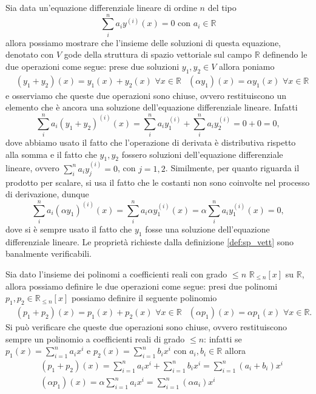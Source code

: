 \begin{example}
    Sia data un'equazione differenziale lineare di ordine $n$ del tipo
    $$
        \sum_i^n a_i y^{(i)}(x) = 0 \text{ con } a_i \in \mathbb{R}
    $$
    allora possiamo mostrare che l'insieme delle soluzioni di questa equazione, denotato con $V$ gode della struttura di spazio vettoriale sul campo $\mathbb{R}$ definendo le due operazioni come segue: prese due soluzioni $y_1, y_2 \in V$ allora poniamo
    \begin{align}
        &(y_1 + y_2)(x) = y_1(x) + y_2(x) \, \, \forall x \in \mathbb{R}
        &(\alpha y_1)(x) = \alpha y_1(x) \, \, \forall x \in \mathbb{R}
    \end{align}
    e osserviamo che queste due operazioni sono chiuse, ovvero restituiscono un elemento che è ancora una soluzione dell'equazione differenziale lineare. Infatti
    $$
        \sum_i^n a_i (y_1 + y_2)^{(i)}(x) = \sum_i^n a_i y_1^{(i)} + \sum_i^n a_i y_2^{(i)} = 0 + 0 = 0,
    $$
    dove abbiamo usato il fatto che l'operazione di derivata è distributiva rispetto alla somma e il fatto che $y_1, y_2$ fossero soluzioni dell'equazione differenziale lineare, ovvero $\sum_i^n a_i y_j^{(i)} = 0$, con $j=1, 2$. Similmente, per quanto riguarda il prodotto per scalare, si usa il fatto che le costanti non sono coinvolte nel processo di derivazione, dunque
    $$
        \sum_i^n a_i(\alpha y_1)^{(i)}(x) = \sum_i^n a_i \alpha y_1^{(i)}(x) = \alpha \sum_i^n a_i y_1^{(i)}(x) = 0,
    $$
    dove si è sempre usato il fatto che $y_1$ fosse una soluzione dell'equazione differenziale lineare. Le proprietà richieste dalla definizione \ref{def:sp_vett} sono banalmente verificabili.
\end{example}
\begin{example}
    Sia dato l'insieme dei polinomi a coefficienti reali con grado $\leq n$ $\mathbb{R}_{\leq n}[x]$ su $\mathbb{R}$, allora possiamo definire le due operazioni come segue: presi due polinomi $p_1, p_2 \in \mathbb{R}_{\leq n}[x]$ possiamo definire il seguente polinomio
    \begin{align}
    &(p_1 + p_2)(x) = p_1(x) + p_2(x) \, \, \forall x \in \mathbb{R}
    &(\alpha p_1)(x) = \alpha p_1(x) \, \, \forall x \in \mathbb{R}.
    \end{align}
    Si può verificare che queste due operazioni sono chiuse, ovvero restituiscono sempre un polinomio a coefficienti reali di grado $\leq n$: infatti se $p_1(x) = \sum\limits_{i=1}^n a_i x^i$ e $p_2(x) = \sum\limits_{i=1}^n b_i x^i$ con $a_i, b_i \in \mathbb{R}$ allora
    \begin{align}
        &(p_1 + p_2)(x) = \sum_{i=1}^n a_i x^i + \sum_{i=1}^n b_i x^i = \sum_{i=1}^n (a_i + b_i) x^i \\
        &(\alpha p_1)(x) = \alpha \sum_{i=1}^n a_i x^i = \sum_{i=1}^n (\alpha a_i) x^i
    \end{align}
\end{example}
